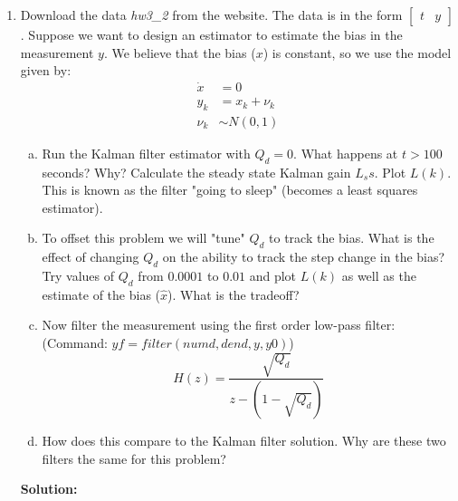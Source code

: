 \documentclass[11pt]{article}
\newcommand{\solution}{\textbf{Solution: \\}}
\begin{document}
\begin{enumerate}[label=\textbf{\arabic*.}]
\begin{enumerate}[(a)]
    ($\hat{x}$ and $\hat{\dot{x}}$) of the 2 states over time. Calculate the 
    norm of the standard deviation of the errors for each state.
    \begin{equation*}
      N = \sqrt{( std(\dot{x} - \hat{\dot{x}}) )^2 + ( std(x - \hat{x}) )^2}
    \end{equation*}
    \item Change the ratio of the $Q_d$ and $R_d$ weights in the Kalman filter 
    design (repeat \emph{part d} with the new Kalman gain but \textbf{DO NOT} 
    regenerate a new $x$ and $\dot{x}$) and determine the effect on the 
    estimation errors. For what ratio of $Q_d$ to $R_d$ are the errors 
    minimized? Note: Often in practice we do not know the actual $Q_d$ and 
    $R_d$, so these tend to be "tuning" parameters we can use to tune our 
    filter. However, according to Kalman the estimation errors are only 
    minimized if we use the $Q_d$ and $R_d$ of the physical system.
  \end{enumerate}
  \solution

  \item Download the data \emph{hw3\_2} from the website. The data is in the 
  form $\begin{bmatrix} t & y \end{bmatrix}$. Suppose we want to design an 
  estimator to estimate the bias in the measurement $y$. We believe that the 
  bias ($x$) is constant, so we use the model given by:
  \begin{equation*}
    \begin{split}
      \dot{x} &= 0 \\
      y_k &= x_k + \nu_k \\
      \nu_k &\sim N(0,1)
    \end{split}
  \end{equation*}
  \begin{enumerate}[(a)]
    \itemsep -2pt 
    \item Run the Kalman filter estimator with $Q_d = 0$. What happens at 
    $t > 100$ seconds? Why? Calculate the steady state Kalman gain $L_ss$. 
    Plot $L(k)$. This is known as the filter "going to sleep" (becomes a least 
    squares estimator).
    \item To offset this problem we will "tune" $Q_d$ to track the bias. What is 
    the effect of changing $Q_d$ on the ability to track the step change in the 
    bias? Try values of $Q_d$ from $0.0001$ to $0.01$ and plot $L(k)$ as well 
    as the estimate of the bias ($\hat{x}$). What is the tradeoff?
    \item Now filter the measurement using the first order low-pass filter: \\
    (Command: $yf = filter(numd, dend, y, y0)$)
    \begin{equation*}
      H(z) = \dfrac{\sqrt{Q_d}}{z - (1-\sqrt{Q_d})}
    \end{equation*}
    \item How does this compare to the Kalman filter solution. Why are these two 
    filters the same for this problem?
  \end{enumerate}
  \solution


\end{enumerate}
\end{document}
